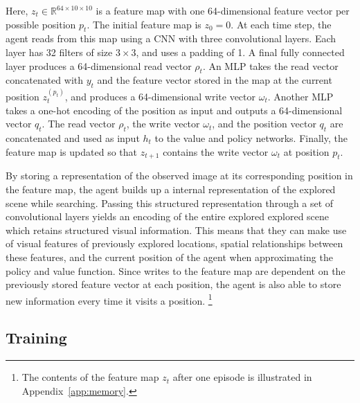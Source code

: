 Here, \(z_t \in \mathbb{R}^{64 \times 10 \times 10}\) is a feature map with one 64-dimensional feature vector per possible position \(p_t\).
The initial feature map is \(z_0 = 0\).
At each time step, the agent reads from this map using a CNN with three convolutional layers.
Each layer has 32 filters of size \(3 \times 3\), and uses a padding of 1.
A final fully connected layer produces a 64-dimensional read vector \(\rho_t\).
An MLP takes the read vector concatenated with \(y_t\) and the feature vector stored in the map at the current position \(z_t^{(p_t)}\), and produces a 64-dimensional write vector \(\omega_{t}\).
Another MLP takes a one-hot encoding of the position as input and outputs a 64-dimensional vector \(q_t\).
The read vector \(\rho_t\), the write vector \(\omega_{t}\), and the position vector \(q_t\) are concatenated and used as input \(h_t\) to the value and policy networks.
Finally, the feature map is updated so that \(z_{t+1}\) contains the write vector \(\omega_{t}\) at position \(p_t\).

By storing a representation of the observed image at its corresponding position in the feature map, the agent builds up a internal representation of the explored scene while searching.
Passing this structured representation through a set of convolutional layers yields an encoding of the entire explored explored scene which retains structured visual information.
This means that they can make use of visual features of previously explored locations, spatial relationships between these features, and the current position of the agent when approximating the policy and value function.
Since writes to the feature map are dependent on the previously stored feature vector at each position, the agent is also able to store new information every time it visits a position.
\footnote{The contents of the feature map \(z_t\) after one episode is illustrated in Appendix~\ref{app:memory}.}


\subsection{Training}

